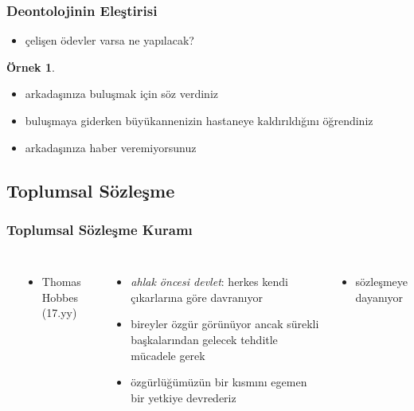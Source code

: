 \documentclass[dvipsnames]{beamer}
\theoremstyle{definition}
\theoremstyle{example}
\newtheorem{ornek}[theorem]{Örnek}
\theoremstyle{plain}
\begin{document}
\begin{frame}
  \frametitle{Deontolojinin Eleştirisi}

  \begin{itemize}
    \item çelişen ödevler varsa ne yapılacak?
  \end{itemize}

  \pause
  \begin{ornek}
    \begin{itemize}
      \item arkadaşınıza buluşmak için söz verdiniz
      \item buluşmaya giderken büyükannenizin hastaneye kaldırıldığını
        öğrendiniz
      \item arkadaşınıza haber veremiyorsunuz
    \end{itemize}
  \end{ornek}
\end{frame}

\subsection{Toplumsal Sözleşme}

\begin{frame}
  \frametitle{Toplumsal Sözleşme Kuramı}

  \begin{columns}
    \begin{center}
    \end{center}
    \begin{itemize}
      \item Thomas Hobbes (17.yy)
    \end{itemize}

    \pause
    \begin{itemize}
      \item \emph{ahlak öncesi devlet}: herkes kendi çıkarlarına göre davranıyor
      \item bireyler özgür görünüyor ancak sürekli başkalarından gelecek tehditle
        mücadele gerek
      \item özgürlüğümüzün bir kısmını egemen bir yetkiye devrederiz
    \end{itemize}

    \pause
    \begin{itemize}
      \item sözleşmeye dayanıyor
    \end{itemize}
  \end{columns}
\end{frame}
\end{document}
